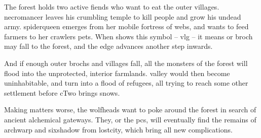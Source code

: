 \begin{multicols}{2}

\renewcommand\csComments{
  \mapCircle{16}{76}{1.7}{Dyson_Logos/bandit_camp}
  \mapCircle{35}{88}{2}{Dyson_Logos/forgotten_city}
  \mapCircle{27}{09}{2}{Dyson_Logos/qualme_temple}
  \mapCircle[4]{56}{52}{2.5}{Dyson_Logos/town}
  \mapCircle{44}{41}{2}{Dyson_Logos/redfall}
  \mapCircle{83}{09}{1.7}{Dyson_Logos/shadow_gate}
  \mapCircle{86}{45}{1.7}{Dyson_Logos/lochside}
  \draw[very thick,white] (11,0.6) -- (12,0.6) node[anchor=north]{\outline{10 Miles}} -- (13,0.6) ;
}



\end{multicols}


\begin{multicols}{2}
\noindent
The forest holds two active \glspl{fiend} who want to eat the outer \glspl{village}.
\Gls{necromancer} leaves his crumbling temple to kill people and grow his undead army.
\Gls{spiderqueen} emerges from her mobile fortress of webs, and wants to feed farmers to her \glspl{crawler} pets.
When  shows this symbol -- \gls{vlg} -- it means  or \gls{broch} may fall to the forest, and the \gls{edge} advances another step inwards.

And if enough outer \glspl{broch} and \glspl{village} fall, all the \glspl{monster} of the forest will flood into the unprotected, interior farmlands.
\Gls{valley} would then become uninhabitable, and turn into a flood of refugees, all trying to reach some other settlement before \gls{cTwo} brings \glspl{snow}.

Making matters worse, the \glspl{wolfhead} want to poke around the forest in search of ancient alchemical gateways.
They, or the \glspl{pc}, will eventually find the remains of \gls{archwarp} and \gls{sixshadow} from \gls{lostcity}, which bring all new complications.

\end{multicols}


